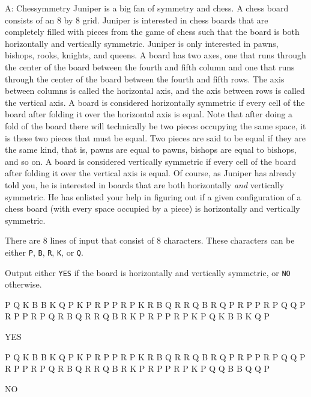 \begin{problem}{A: Chessymmetry} 
Juniper is a big fan of symmetry and chess.
A chess board consists of an 8 by 8 grid.
Juniper is interested in chess boards that are completely filled with pieces from the game of chess such that the board is both horizontally and vertically symmetric.
Juniper is only interested in pawns, bishops, rooks, knights, and queens.
A board has two axes, one that runs through the center of the board between the fourth and fifth column and one that runs through the center of the board between the fourth and fifth rows.
The axis between columns is called the horizontal axis, and the axis between rows is called the vertical axis.
A board is considered horizontally symmetric if every cell of the board after folding it over the horizontal axis is equal.
Note that after doing a fold of the board there will technically be two pieces occupying the same space, it is these two pieces that must be equal.
Two pieces are said to be equal if they are the same kind, that is, pawns are equal to pawns, bishops are equal to bishops, and so on.
A board is considered vertically symmetric if every cell of the board after folding it over the vertical axis is equal.
Of course, as Juniper has already told you, he is interested in boards that are both horizontally \textit{and} vertically symmetric.
He has enlisted your help in figuring out if a given configuration of a chess board (with every space occupied by a piece) is horizontally and vertically symmetric.
\end{problem}

\begin{formalin}
There are 8 lines of input that consist of 8 characters.
These characters can be either \texttt{P}, \texttt{B}, \texttt{R}, \texttt{K}, or \texttt{Q}.
\end{formalin}

\begin{formalout}
Output either \texttt{YES} if the board is horizontally and vertically symmetric, or \texttt{NO} otherwise. 
\end{formalout}

\begin{datain}
P Q K B B K Q P
K P R P P R P K
R B Q R R Q B R
Q P R P P R P Q
Q P R P P R P Q
R B Q R R Q B R
K P R P P R P K
P Q K B B K Q P
\end{datain}
\begin{dataout}
YES
\end{dataout}

\begin{datain}
P Q K B B K Q P
K P R P P R P K
R B Q R R Q B R
Q P R P P R P Q
Q P R P P R P Q
R B Q R R Q B R
K P R P P R P K
P Q Q B B Q Q P
\end{datain}
\begin{dataout}
NO
\end{dataout}

